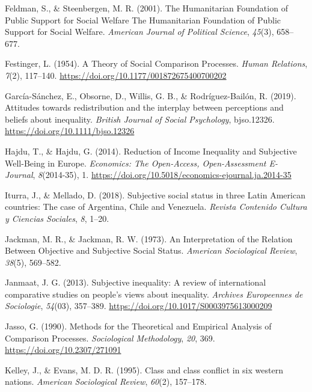 \documentclass[
  12pt,
]{book}
\newlength{\cslhangindent}
\newlength{\cslentryspacingunit} %
\newenvironment{CSLReferences}[2] %
 {%
  \setlength{\parindent}{0pt}
  \ifodd #1
  \let\oldpar\par
  \def\par{\hangindent=\cslhangindent\oldpar}
  \fi
  \setlength{\parskip}{#2\cslentryspacingunit}
 }%
 {}
\begin{document}
\begin{CSLReferences}{1}{0}
\leavevmode{}%
Feldman, S., \& Steenbergen, M. R. (2001). The {Humanitarian Foundation} of {Public Support} for {Social Welfare The Humanitarian Foundation} of {Public Support} for {Social Welfare}. \emph{American Journal of Political Science}, \emph{45}(3), 658--677.

\leavevmode{}%
Festinger, L. (1954). A {Theory} of {Social Comparison Processes}. \emph{Human Relations}, \emph{7}(2), 117--140. \url{https://doi.org/10.1177/001872675400700202}

\leavevmode{}%
García-Sánchez, E., Obsorne, D., Willis, G. B., \& Rodríguez-Bailón, R. (2019). Attitudes towards redistribution and the interplay between perceptions and beliefs about inequality. \emph{British Journal of Social Psychology}, bjso.12326. \url{https://doi.org/10.1111/bjso.12326}

\leavevmode{}%
Hajdu, T., \& Hajdu, G. (2014). Reduction of {Income Inequality} and {Subjective Well-Being} in {Europe}. \emph{Economics: The Open-Access, Open-Assessment E-Journal}, \emph{8}(2014-35), 1. \url{https://doi.org/10.5018/economics-ejournal.ja.2014-35}

\leavevmode{}%
Iturra, J., \& Mellado, D. (2018). Subjective social status in three {Latin American} countries: {The} case of {Argentina}, {Chile} and {Venezuela}. \emph{Revista Contenido Cultura y Ciencias Sociales}, \emph{8}, 1--20.

\leavevmode{}%
Jackman, M. R., \& Jackman, R. W. (1973). An {Interpretation} of the {Relation Between Objective} and {Subjective Social Status}. \emph{American Sociological Review}, \emph{38}(5), 569--582.

\leavevmode{}%
Janmaat, J. G. (2013). Subjective inequality: {A} review of international comparative studies on people's views about inequality. \emph{Archives Europeennes de Sociologie}, \emph{54}(03), 357--389. \url{https://doi.org/10.1017/S0003975613000209}

\leavevmode{}%
Jasso, G. (1990). Methods for the {Theoretical} and {Empirical Analysis} of {Comparison Processes}. \emph{Sociological Methodology}, \emph{20}, 369. \url{https://doi.org/10.2307/271091}

\leavevmode{}%
Kelley, J., \& Evans, M. D. R. (1995). Class and class conflict in six western nations. \emph{American Sociological Review}, \emph{60}(2), 157--178.


\end{CSLReferences}
\end{document}

